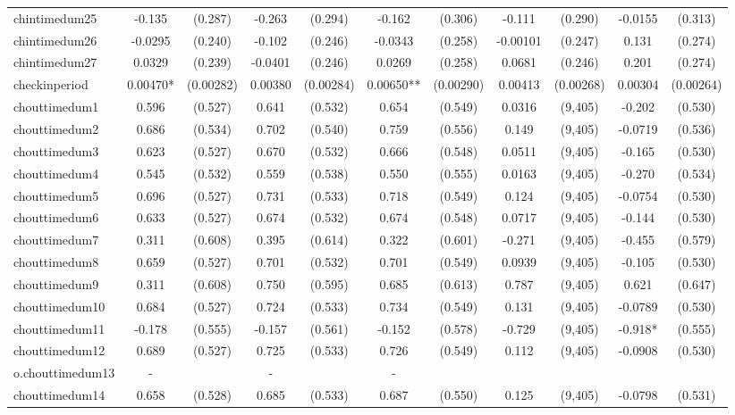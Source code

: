\documentclass[]{article}
\begin{document}
\begin{tabular}{lcccccccccc}
chintimedum25 & -0.135 & (0.287) & -0.263 & (0.294) & -0.162 & (0.306) & -0.111 & (0.290) & -0.0155 & (0.313) \\
chintimedum26 & -0.0295 & (0.240) & -0.102 & (0.246) & -0.0343 & (0.258) & -0.00101 & (0.247) & 0.131 & (0.274) \\
chintimedum27 & 0.0329 & (0.239) & -0.0401 & (0.246) & 0.0269 & (0.258) & 0.0681 & (0.246) & 0.201 & (0.274) \\
checkinperiod & 0.00470* & (0.00282) & 0.00380 & (0.00284) & 0.00650** & (0.00290) & 0.00413 & (0.00268) & 0.00304 & (0.00264) \\
chouttimedum1 & 0.596 & (0.527) & 0.641 & (0.532) & 0.654 & (0.549) & 0.0316 & (9,405) & -0.202 & (0.530) \\
chouttimedum2 & 0.686 & (0.534) & 0.702 & (0.540) & 0.759 & (0.556) & 0.149 & (9,405) & -0.0719 & (0.536) \\
chouttimedum3 & 0.623 & (0.527) & 0.670 & (0.532) & 0.666 & (0.548) & 0.0511 & (9,405) & -0.165 & (0.530) \\
chouttimedum4 & 0.545 & (0.532) & 0.559 & (0.538) & 0.550 & (0.555) & 0.0163 & (9,405) & -0.270 & (0.534) \\
chouttimedum5 & 0.696 & (0.527) & 0.731 & (0.533) & 0.718 & (0.549) & 0.124 & (9,405) & -0.0754 & (0.530) \\
chouttimedum6 & 0.633 & (0.527) & 0.674 & (0.532) & 0.674 & (0.548) & 0.0717 & (9,405) & -0.144 & (0.530) \\
chouttimedum7 & 0.311 & (0.608) & 0.395 & (0.614) & 0.322 & (0.601) & -0.271 & (9,405) & -0.455 & (0.579) \\
chouttimedum8 & 0.659 & (0.527) & 0.701 & (0.532) & 0.701 & (0.549) & 0.0939 & (9,405) & -0.105 & (0.530) \\
chouttimedum9 & 0.311 & (0.608) & 0.750 & (0.595) & 0.685 & (0.613) & 0.787 & (9,405) & 0.621 & (0.647) \\
chouttimedum10 & 0.684 & (0.527) & 0.724 & (0.533) & 0.734 & (0.549) & 0.131 & (9,405) & -0.0789 & (0.530) \\
chouttimedum11 & -0.178 & (0.555) & -0.157 & (0.561) & -0.152 & (0.578) & -0.729 & (9,405) & -0.918* & (0.555) \\
chouttimedum12 & 0.689 & (0.527) & 0.725 & (0.533) & 0.726 & (0.549) & 0.112 & (9,405) & -0.0908 & (0.530) \\
o.chouttimedum13 & - &  & - &  & - &  &  &  &  &  \\
chouttimedum14 & 0.658 & (0.528) & 0.685 & (0.533) & 0.687 & (0.550) & 0.125 & (9,405) & -0.0798 & (0.531) \\

\end{tabular}
\end{document}
